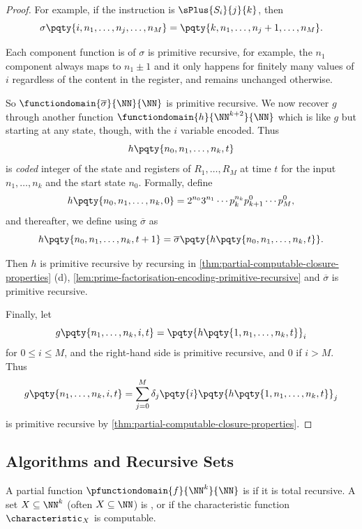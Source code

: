 \begin{proof}
    For example, if the instruction is \(\sPlus{S_i}{j}{k}\), then
    \[
        \sigma\pqty{i, n_1, \ldots, n_j, \ldots, n_M} = \pqty{k, n_1, \ldots, n_j + 1, \ldots, n_M}.
    \]

    Each component function is of \(\sigma\) is primitive recursive, for example, the \(n_1\) component always maps to \(n_1 \pm 1\) and it only happens for finitely many values of \(i\) regardless of the content in the register, and remains unchanged otherwise.

    So \(\functiondomain{\overline{\sigma}}{\NN}{\NN}\) is primitive recursive. We now recover \(g\) through another function \(\functiondomain{h}{\NN^{k + 2}}{\NN}\) which is like \(g\) but starting at any state, though, with the \(i\) variable encoded. Thus
    \[
        h\pqty{n_0, n_1, \ldots, n_k, t}
    \]
    is \emph{coded} integer of the state and registers of \(R_1, \ldots, R_M\) at time \(t\) for the input \(n_1, \ldots, n_k\) and the start state \(n_0\). Formally, define
    \[
        h\pqty{n_0, n_1, \ldots, n_k, 0} = 2^{n_0} 3^{n_1} \cdots p_k^{n_k} p_{k + 1}^0 \cdots p_M^0,
    \]
    and thereafter, we define using \(\overline{\sigma}\) as
    \[
        h\pqty{n_0, n_1, \ldots, n_k, t + 1} = \overline{\sigma}\pqty{h\pqty{n_0, n_1, \ldots, n_k, t}}.
    \]

    Then \(h\) is primitive recursive by recursing in \autoref{thm:partial-computable-closure-properties} (d), \autoref{lem:prime-factorisation-encoding-primitive-recursive} and \(\overline{\sigma}\) is primitive recursive.

    Finally, let
    \[
        g \pqty{n_1, \ldots, n_k, i, t} = \pqty{h \pqty{1, n_1, \ldots, n_k, t}}_i
    \]
    for \(0 \leq i \leq M\), and the right-hand side is primitive recursive, and \(0\) if \(i > M\). Thus
    \[
        g \pqty{n_1, \ldots, n_k, i, t} = \sum_{j = 0}^{M} \delta_j\pqty{i} \pqty{h \pqty{1, n_1, \ldots, n_k, t}}_j
    \]
    is primitive recursive by \autoref{thm:partial-computable-closure-properties}.
\end{proof}

\subsection{Algorithms and Recursive Sets}

\begin{definition}
    A partial function \(\pfunctiondomain{f}{\NN^k}{\NN}\) is  if it is total recursive. A set \(X \subseteq \NN^k\) (often \(X \subseteq \NN\)) is ,  or  if the characteristic function \(\characteristic_{X}\) is computable.
\end{definition}

